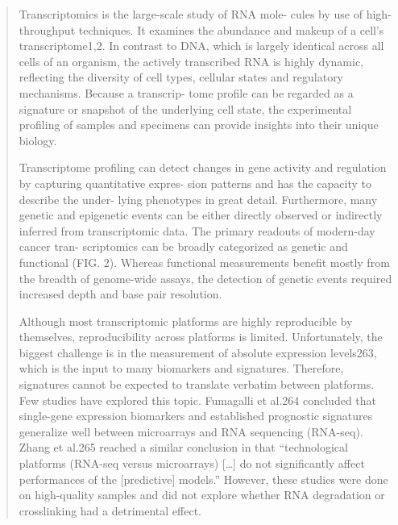 \documentclass[12pt,]{book}
\theoremstyle{definition}
\theoremstyle{definition}
\theoremstyle{definition}
\theoremstyle{remark}
\begin{document}
\begin{quote}
Transcriptomics is the large-scale study of RNA mole- cules by use of
high-throughput techniques. It examines the abundance and makeup of a
cell's transcriptome1,2. In contrast to DNA, which is largely identical
across all cells of an organism, the actively transcribed RNA is highly
dynamic, reflecting the diversity of cell types, cellular states and
regulatory mechanisms. Because a transcrip- tome profile can be regarded
as a signature or snapshot of the underlying cell state, the
experimental profiling of samples and specimens can provide insights
into their unique biology.

Transcriptome profiling can detect changes in gene activity and
regulation by capturing quantitative expres- sion patterns and has the
capacity to describe the under- lying phenotypes in great detail.
Furthermore, many genetic and epigenetic events can be either directly
observed or indirectly inferred from transcriptomic data. The primary
readouts of modern-day cancer tran- scriptomics can be broadly
categorized as genetic and functional (FIG. 2). Whereas functional
measurements benefit mostly from the breadth of genome-wide assays, the
detection of genetic events required increased depth and base pair
resolution.

Although most transcriptomic platforms are highly reproducible by
themselves, reproducibility across platforms is limited. Unfortunately,
the biggest challenge is in the measurement of absolute expression
levels263, which is the input to many biomarkers and signatures.
Therefore, signatures cannot be expected to translate verbatim between
platforms. Few studies have explored this topic. Fumagalli et al.264
concluded that single-gene expression biomarkers and established
prognostic signatures generalize well between microarrays and RNA
sequencing (RNA-seq). Zhang et al.265 reached a similar conclusion in
that ``technological platforms (RNA-seq versus microarrays)
{[}\ldots{}{]} do not significantly affect performances of the
{[}predictive{]} models.'' However, these studies were done on
high-quality samples and did not explore whether RNA degradation or
crosslinking had a detrimental effect.


\end{quote}
\end{document}
